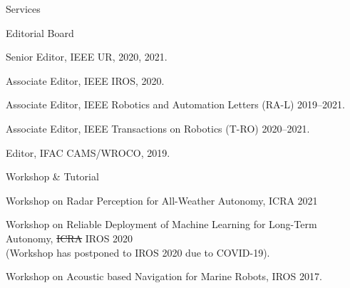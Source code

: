 \begin{rSection}{Services}
\begin{rSubsection}{Editorial Board}{}{}{}
  \item Senior Editor, IEEE UR, 2020, 2021.
  \item Associate Editor, IEEE IROS, 2020.
  \item Associate Editor, IEEE Robotics and Automation Letters (RA-L) 2019--2021.
  \item Associate Editor, IEEE Transactions on Robotics (T-RO) 2020--2021.
  \item Editor, IFAC CAMS/WROCO, 2019.
\end{rSubsection}

\begin{rSubsection}{Workshop \& Tutorial}{}{}{}
  \item Workshop on Radar Perception for All-Weather Autonomy, ICRA 2021
  \item Workshop on Reliable Deployment of Machine Learning for Long-Term Autonomy, \sout{ICRA} IROS 2020\\
  (Workshop has postponed to IROS 2020 due to COVID-19).
  \item Workshop on Acoustic based Navigation for Marine Robots, IROS 2017.
\end{rSubsection}


\end{rSection}

